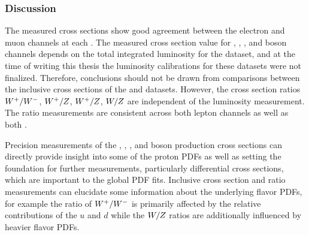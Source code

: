 \subsubsection{Discussion}
The measured cross sections show good agreement between the electron and muon channels at each \s. The measured cross section value for \Wp, \Wm, \W, and \Z boson channels depends on the total integrated luminosity for the dataset, and at the time of writing this thesis the luminosity calibrations for these datasets were not finalized. Therefore, conclusions should not be drawn from comparisons between the inclusive cross sections of the \sg and \sh datasets. However, the cross section ratios $W^+/W^-$, $W^+/Z$, $W^+/Z$, $W/Z$ are independent of the luminosity measurement. The ratio measurements are consistent across both lepton channels as well as both \s. 

Precision measurements of the \Wp, \Wm, \W, and \Z boson production cross sections can directly provide insight into some of the proton PDFs as well as setting the foundation for further measurements, particularly differential cross sections, which are important to the global PDF fits. Inclusive cross section and ratio measurements can elucidate some information about the underlying flavor PDFs, for example the ratio of $W^+/W^-$ is primarily affected by the relative contributions of the $u$ and $d$ while the $W/Z$ ratios are additionally influenced by heavier flavor PDFs.
